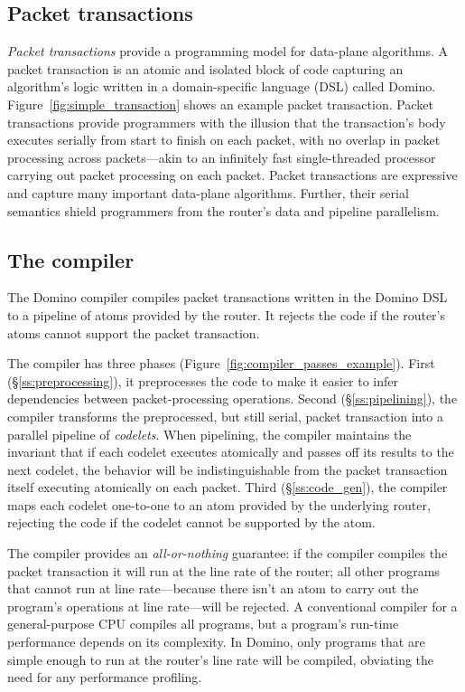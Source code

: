 \subsection{Packet transactions} \textit{Packet transactions} provide a programming
model for data-plane algorithms. A packet transaction is an atomic and isolated
block of code capturing an algorithm's logic written in a domain-specific
language (DSL) called Domino. Figure~\ref{fig:simple_transaction} shows an
example packet transaction.  Packet transactions provide programmers with the
illusion that the transaction's body executes serially from start to finish on
each packet, with no overlap in packet processing across packets---akin to an
infinitely fast single-threaded processor carrying out packet processing on
each packet. Packet transactions are expressive and capture many important
data-plane algorithms.  Further, their serial semantics shield programmers from
the router's data and pipeline parallelism.

\subsection{The compiler} The Domino compiler compiles packet transactions
written in the Domino DSL to a pipeline of atoms provided by the router. It
rejects the code if the router's atoms cannot support the packet transaction.

The compiler has three phases (Figure~\ref{fig:compiler_passes_example}). First
(\S\ref{ss:preprocessing}), it preprocesses the code to make it easier to infer
dependencies between packet-processing operations. Second
(\S\ref{ss:pipelining}), the compiler transforms the preprocessed, but still
serial, packet transaction into a parallel pipeline of {\em codelets}.  When
pipelining, the compiler maintains the invariant that if each codelet executes
atomically and passes off its results to the next codelet, the behavior will be
indistinguishable from the packet transaction itself executing atomically on
each packet. Third (\S\ref{ss:code_gen}), the compiler maps each codelet
one-to-one to an atom provided by the underlying router, rejecting the code if
the codelet cannot be supported by the atom.

The compiler provides an {\em all-or-nothing} guarantee: if the compiler
compiles the packet transaction it will run at the line rate of the router; all
other programs that cannot run at line rate---because there isn't an atom to
carry out the program's operations at line rate---will be rejected. A
conventional compiler for a general-purpose CPU compiles all programs, but a
program's run-time performance depends on its complexity. In Domino, only
programs that are simple enough to run at the router's line rate will be
compiled, obviating the need for any performance profiling.

